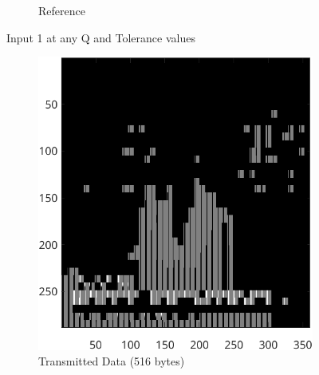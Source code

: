 \documentclass{article}
\begin{document}
\begin{figure}[ht]
\begin{subfigure}[t]{0.45\textwidth}
			\caption{Reference}
			\label{fig:2B_Input1anyref}

		\end{subfigure}


		\caption{Input 1 at any Q and Tolerance values}
		\label{fig:2B_Input1anyall}
	\end{figure}

	\begin{figure}[ht]
		\centering
		\begin{subfigure}[t]{0.45\textwidth}
			\centering

			\includegraphics[width=\textwidth]{2B_Input1TD}

			\caption{Transmitted Data (516 bytes)}
			\label{fig:2B_Input1TD}

		\end{subfigure}
		\hspace{1cm}
		\begin{subfigure}[t]{0.45\textwidth}
			\centering


\end{subfigure}
\end{figure}
\end{document}
